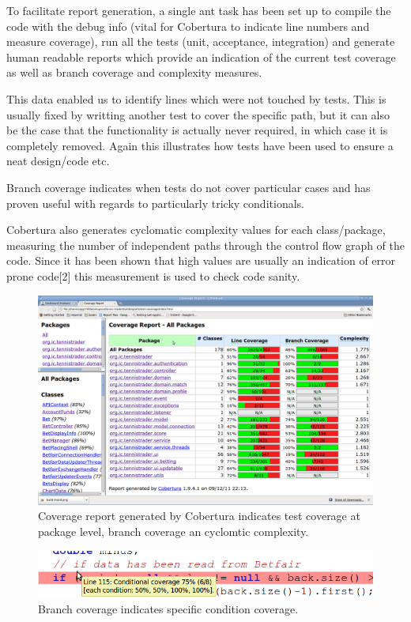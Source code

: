 \documentclass[10pt]{article}
\begin{document}
To facilitate report generation, a single ant task has been set up to compile the code with the debug info (vital for Cobertura to indicate line numbers and measure coverage), run all the tests (unit, acceptance, integration) and generate human readable reports which provide an indication of the current test coverage as well as branch coverage and complexity measures.

This data enabled us to identify lines which were not touched by tests. This is usually fixed by writting another test to cover the specific path, but it can also be the case that the functionality is actually never required, in which case it is completely removed. Again this illustrates how tests have been used to ensure a neat design/code etc. 

Branch coverage indicates when tests do not cover particular cases and has proven useful with regards to particularly tricky conditionals.

Cobertura also generates cyclomatic complexity values for each class/package, measuring the number of independent paths through the control flow graph of the code. Since it has been shown that high values are usually an indication of error prone code[2] this measurement is used to check code sanity.

\begin{figure}[ht]
\centering
\includegraphics[bb=0 0 1680 1050, scale = 0.2]{coverage.png}
\caption{Coverage report generated by Cobertura indicates test coverage at package level, branch coverage an cyclomtic complexity.}
\end{figure}



\begin{figure}[ht]
\centering
\includegraphics[bb=0 0 700 100, scale = 0.49]{branch.png}
\caption{Branch coverage indicates specific condition coverage.}
\end{figure}
\end{document}
